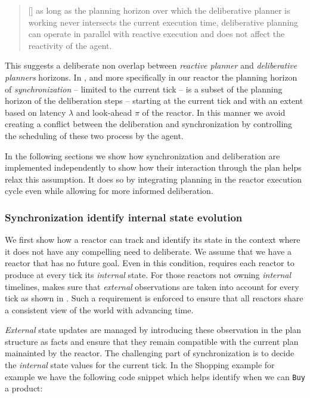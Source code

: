 {\scriptsize
  \begin{quote}
  [\textellipsis] as long as the planning horizon over which the
  deliberative planner is working never intersects the current
  execution time, deliberative planning can operate in parallel with
  reactive execution and does not affect the reactivity of the agent. 
\end{quote}}

This suggests a deliberate non overlap between {\em reactive planner}
and {\em deliberative planners} horizons. In \rx, and more
specifically in our \eu reactor the planning horizon of {\em
  synchronization} -- limited to the current tick -- is a subset of
the planning horizon of the deliberation steps -- starting at the
current tick and with an extent based on latency $\lambda$ and
look-ahead $\pi$ of the reactor. In this manner we avoid creating a
conflict between the deliberation and synchronization by controlling
the scheduling of these two process by the \rx agent.

In the following sections we show how synchronization and deliberation
are implemented independently to show how their interaction through
the plan helps relax this assumption. It does so by integrating
planning in the reactor execution cycle even while allowing for more
informed deliberation.

\subsubsection{Synchronization identify internal state evolution}
\label{sec:arch:synch}

We first show how a reactor can track and identify its state in the
context where it does not have any compelling need to deliberate. We
assume that we have a reactor that has no future goal. Even in this
condition, \rx requires each reactor to produce at every tick its {\em
  internal} state. For those reactors not owning {\em internal}
timelines, \rx makes sure that {\em external} observations are taken
into account for every tick as shown in \cite{py10}. Such a
requirement is enforced to ensure that all reactors share a consistent
view of the world with advancing time.

{\em External} state updates are managed by introducing these
observation in the plan structure as facts and ensure that they remain
compatible with the current plan mainainted by the reactor. The
challenging part of synchronization is to decide the {\em internal}
state values for the current tick. In the Shopping example for example
we have the following code snippet which helps identify when we can
\texttt{Buy} a product:

